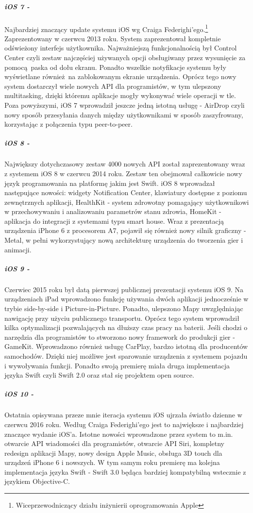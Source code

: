 \documentclass[11pt,twoside,a4paper]{report}
\begin{document}
\subparagraph{iOS 7 -}Najbardziej znaczący update systemu iOS wg Craiga Federighi'ego.\footnote{Wiceprzewodniczący działu inżynierii oprogramowania Apple} Zaprezentowany w czerwcu 2013 roku. System zaprezentował kompletnie odświeżony interfejs użytkownika. Najważniejszą funkcjonalnością był Control Center czyli zestaw najczęściej używanych opcji obsługiwany przez wysunięcie za pomocą paska od dołu ekranu. Ponadto wszelkie notyfikacje systemu były wyświetlane również na zablokowanym ekranie urządzenia. Oprócz tego nowy system dostarczył wiele nowych API dla programistów, w tym ulepszony multitasking, dzięki któremu aplikacje mogły wykonywać wiele operacji w tle. Poza powyższymi, iOS 7 wprowadził jeszcze jedną istotną usługę - AirDrop czyli nowy sposób przesyłania danych między użytkownikami w sposób zaszyfrowany, korzystając z połączenia typu peer-to-peer.\cite{ios7}
\subparagraph{iOS 8 -}Największy dotychczasowy zestaw 4000 nowych API został zaprezentowany wraz z systemem iOS 8 w czerwcu 2014 roku. Zestaw ten obejmował całkowicie nowy język programowania na platformę jakim jest Swift. iOS 8 wprowadzał następujące nowości: widgety Notification Center, klawiatury dostępne z poziomu zewnętrznych aplikacji, HealthKit - system zdrowotny pomagający użytkownikowi w przechowywaniu i analizowaniu parametrów stanu zdrowia, HomeKit - aplikacja do integracji z systemami typu smart house. Wraz z prezentacją urządzenia iPhone 6 z procesorem A7, pojawił się również nowy silnik graficzny - Metal, w pełni wykorzystujący nową architekturę urządzenia do tworzenia gier i animacji.\cite{ios8}
\subparagraph{iOS 9 -}Czerwiec 2015 roku był datą pierwszej publicznej prezentacji systemu iOS 9. Na urządzeniach iPad wprowadzono funkcję używania dwóch aplikacji jednocześnie w trybie side-by-side i Picture-in-Picture. Ponadto, ulepszono Mapy uwzględniając nawigację przy użyciu publicznego transportu. Oprócz tego system wprowadził kilka optymalizacji pozwalających na dłuższy czas pracy na baterii. Jeśli chodzi o narzędzia dla programistów to stworzono nowy framework do produkcji gier - GameKit. Wprowadzono również usługę CarPlay, bardzo istotną dla producentów samochodów. Dzięki niej możliwe jest sparowanie urządzenia z systemem pojazdu i wywoływania funkcji. Ponadto swoją premierę miała druga implementacja języka Swift czyli Swift 2.0 oraz stał się projektem open source.\cite{ios9}
\subparagraph{iOS 10 -}Ostatnia opisywana przeze mnie iteracja systemu iOS ujrzała światło dzienne w czerwcu 2016 roku. Według Craiga Federighi'ego jest to największe i najbardziej znaczące wydanie iOS'a. Istotne nowości wprowadzone przez system to m.in. otwarcie API wiadomości dla programistów, otwarcie API Siri, kompletny redesign aplikacji Mapy, nowy design Apple Music, obsługa 3D touch dla urządzeń iPhone 6 i nowszych. W tym samym roku premierę ma kolejna implementacja języka Swift - Swift 3.0 będąca bardziej kompatybilną wstecznie z językiem Objective-C.\cite{compatibility}\cite{ios10}
\end{document}
